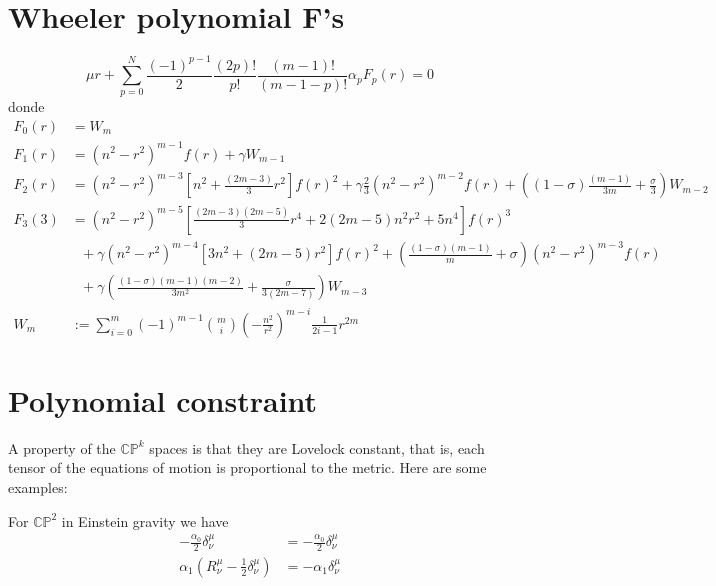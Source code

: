\section{Wheeler polynomial F's}
\begin{equation}
  \mu  r+ \sum_{p=0}^N\frac{(-1)^{p-1}}{2}\frac{(2p)!}{p!}\frac{(m-1)!}{(m-1-p)!}\alpha_p  F_p(r)=0
\end{equation}
donde
\begin{align*}
  F_0(r)&=W_m\\
  F_1(r)&=(n^2-r^2)^{m-1}f(r)+\gamma W_{m-1}\\
  F_2(r)&=(n^2-r^2)^{m-3}\left[n^2+\frac{(2m-3)}{3}r^2\right]f(r)^2+\gamma\frac{2}{3}(n^2-r^2)^{m-2}f(r)+\left((1-\sigma)\frac{(m-1)}{3m}+\frac{\sigma}{3}\right)W_{m-2}\\
  F_3(3)&=(n^2-r^2)^{m-5}\left[\frac{(2m-3)(2m-5)}{3}r^4+2(2m-5)n^2r^2+5n^4\right]f(r)^3\\ &~~~+ \gamma(n^2-r^2)^{m-4}[3n^2+(2m-5)r^2]f(r)^2+\left(\frac{(1-\sigma)(m-1)}{m}+\sigma\right)(n^2-r^2)^{m-3}f(r)\\&~~~+\gamma \left(\frac{(1-\sigma)(m-1)(m-2)}{3m^2}+\frac{\sigma}{3(2m-7)}\right)W_{m-3}\\
    W_m&:=\sum_{i=0}^m(-1)^{m-1}\binom{m}{i}\left(-\frac{n^2}{r^2}\right)^{m-i}\frac{1}{2i-1}r^{2m}
\end{align*}
























\newpage
\section{Polynomial constraint}
A property of the $\mathbb{CP}^k$ spaces is that they are Lovelock constant, that is, each tensor of the equations of motion is proportional to the metric. Here are some examples:

For $\mathbb{CP}^2$ in Einstein gravity we have
\begin{align*}
    -\frac{\alpha_0}{2}\delta^\mu_\nu&=-\frac{\alpha_0}{2}\delta^\mu_\nu\\
    \alpha_1\left(R^\mu_\nu-\frac{1}{2}\delta^\mu_\nu\right)&=-\alpha_1\delta^\mu_\nu
\end{align*}

